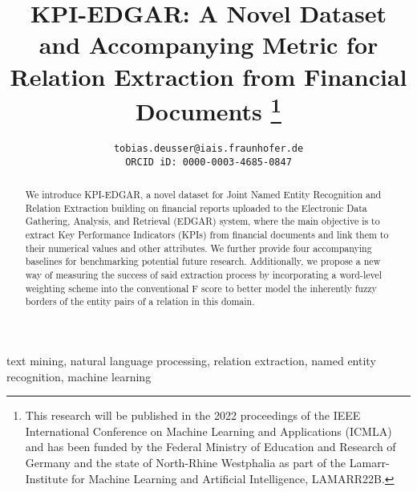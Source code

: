 \documentclass[conference, table]{IEEEtran}
\newcommand{\1} {\mathbbm{1}}
\begin{document}
\title{
KPI-EDGAR: A Novel Dataset and Accompanying Metric for Relation Extraction from Financial Documents
\thanks{This research will be published in the 2022 proceedings of the IEEE International Conference on Machine Learning and Applications (ICMLA) and has been funded by the Federal Ministry of Education and Research of Germany and the state of North-Rhine Westphalia as part of the Lamarr-Institute for Machine Learning and Artificial Intelligence, LAMARR22B.}
}

\author{
    \texttt{tobias.deusser@iais.fraunhofer.de}
    \\ \texttt{ORCID iD: 0000-0003-4685-0847}
}

\maketitle

\begin{abstract}
We introduce KPI-EDGAR, a novel dataset for Joint Named Entity Recognition and Relation Extraction building on financial reports uploaded to the Electronic Data Gathering, Analysis, and Retrieval (EDGAR) system, where the main objective is to extract Key Performance Indicators (KPIs) from financial documents and link them to their numerical values and other attributes. We further provide four accompanying baselines for benchmarking potential future research. Additionally, we propose a new way of measuring the success of said extraction process by incorporating a word-level weighting scheme into the conventional F score to better model the inherently fuzzy borders of the entity pairs of a relation in this domain.
\end{abstract}

\begin{IEEEkeywords}
text mining, natural language processing, relation extraction, named entity recognition, machine learning
\end{IEEEkeywords}
\end{document}
